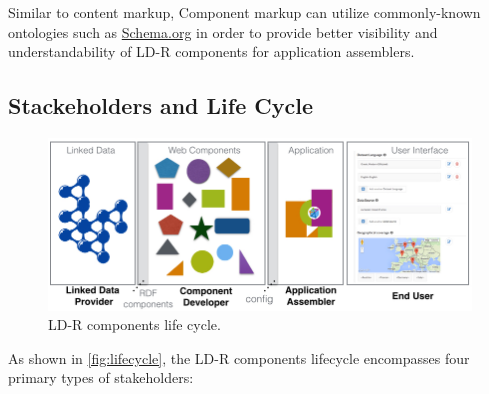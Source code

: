 \documentclass{acm_proc_article-sp}
\begin{document}
Similar to content markup, Component markup can utilize commonly-known ontologies such as \url{Schema.org} in order to provide better visibility and understandability of LD-R components for application assemblers.

\subsection{Stackeholders and Life Cycle}
\begin{figure}[tb]
  \includegraphics[width=1\linewidth]{images/lifecycle.jpg}
  \caption{LD-R components life cycle.}
  \label{fig:lifecycle}
\end{figure}

As shown in \autoref{fig:lifecycle}, the LD-R components lifecycle encompasses four primary types of stakeholders:
\end{document}
